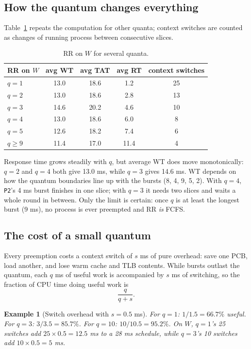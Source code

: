 \documentclass[11pt]{article}
\newtheorem{example}{Example}
\begin{document}
\subsection*{How the quantum changes everything}

Table~\ref{tab:sweep} repeats the computation for other quanta; context switches are counted as changes of running process between consecutive slices.

\begin{table}[h]
\centering
\renewcommand{\arraystretch}{1.15}
\begin{tabular}{lcccc}
  \textbf{RR on $W$} & \textbf{avg WT} & \textbf{avg TAT} & \textbf{avg RT} & \textbf{context switches} \\ \hline
  $q=1$ & 13.0 & 18.6 & 1.2 & 25 \\
  $q=2$ & 13.0 & 18.6 & 2.8 & 13 \\
  $q=3$ & 14.6 & 20.2 & 4.6 & 10 \\
  $q=4$ & 13.0 & 18.6 & 6.0 & 8 \\
  $q=5$ & 12.6 & 18.2 & 7.4 & 6 \\
  $q\ge 9$ & 11.4 & 17.0 & 11.4 & 4 \\
\end{tabular}
\caption{RR on $W$ for several quanta.}
\label{tab:sweep}
\end{table}

Response time grows steadily with $q$, but average WT does  move monotonically: $q=2$ and $q=4$ both give 13.0 ms, while $q=3$ gives 14.6 ms. WT depends on how the quantum boundaries line up with the bursts (8, 4, 9, 5, 2). With $q=4$, \texttt{P2}'s 4 ms burst finishes in one slice; with $q=3$ it needs two slices and waits a whole round in between. Only the limit is certain: once $q$ is at least the longest burst (9 ms), no process is ever preempted and RR \emph{is} FCFS.

\subsection*{The cost of a small quantum}

Every preemption costs a context switch of $s$ ms of pure overhead: save one PCB, load another, and lose warm cache and TLB contents. While bursts outlast the quantum, each $q$ ms of useful work is accompanied by $s$ ms of switching, so the fraction of CPU time doing useful work is
\[
  \frac{q}{q+s}.
\]

\begin{example}[Switch overhead with $s=0.5$ ms]
For $q=1$: $1/1.5 = 66.7\%$ useful. For $q=3$: $3/3.5 = 85.7\%$. For $q=10$: $10/10.5 = 95.2\%$. On $W$, $q=1$'s 25 switches add $25 \times 0.5 = 12.5$ ms to a 28 ms schedule, while $q=3$'s 10 switches add $10 \times 0.5 = 5$ ms.
\end{example}
\end{document}

